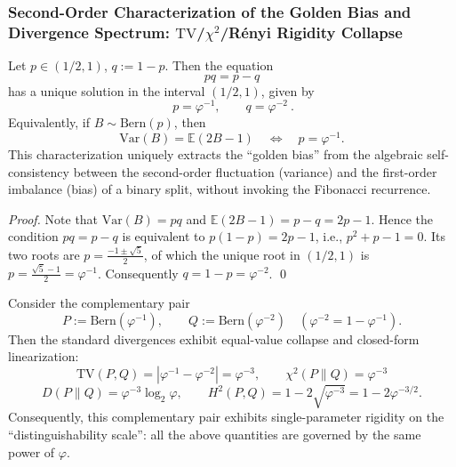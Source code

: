 \subsubsection{Second-Order Characterization of the Golden Bias and Divergence Spectrum: \texorpdfstring{$\mathrm{TV}$}{TV}/\texorpdfstring{$\chi^2$}{chi2}/R\'enyi Rigidity Collapse}

\begin{proposition}[``Variance = Bias'' Characterization and Uniqueness of the Golden Bias]\label{prop:pom-golden-bias-variance-equals-bias}
Let \(p\in(1/2,1)\), \(q:=1-p\).
Then the equation
\[
pq=p-q
\]
has a unique solution in the interval \((1/2,1)\), given by
\[
\boxed{\ p=\varphi^{-1},\qquad q=\varphi^{-2}\ }.
\]
Equivalently, if \(B\sim\mathrm{Bern}(p)\), then
\[
\mathrm{Var}(B)=\mathbb{E}(2B-1)
\quad\Longleftrightarrow\quad
p=\varphi^{-1}.
\]
This characterization uniquely extracts the ``golden bias'' from the algebraic self-consistency between the second-order fluctuation (variance) and the first-order imbalance (bias) of a binary split, without invoking the Fibonacci recurrence.
\end{proposition}

\begin{proof}
Note that \(\mathrm{Var}(B)=pq\) and \(\mathbb{E}(2B-1)=p-q=2p-1\).
Hence the condition \(pq=p-q\) is equivalent to
\(
p(1-p)=2p-1
\), i.e.,
\(
p^2+p-1=0
\).
Its two roots are \(p=\frac{-1\pm\sqrt5}{2}\), of which the unique root in \((1/2,1)\) is \(p=\frac{\sqrt5-1}{2}=\varphi^{-1}\).
Consequently \(q=1-p=\varphi^{-2}\). \qed
\end{proof}

\begin{proposition}\label{prop:pom-complementary-golden-bernoulli-divergence-collapse}
Consider the complementary pair
\[
P:=\mathrm{Bern}(\varphi^{-1}),\qquad
Q:=\mathrm{Bern}(\varphi^{-2})\quad(\varphi^{-2}=1-\varphi^{-1}).
\]
Then the standard divergences exhibit equal-value collapse and closed-form linearization:
\[
\boxed{\;
\mathrm{TV}(P,Q)=|\varphi^{-1}-\varphi^{-2}|=\varphi^{-3},\qquad
\chi^2(P\|Q)=\varphi^{-3}\;}
\]
\[
\boxed{\;
D(P\|Q)=\varphi^{-3}\log_2\varphi,\qquad
H^2(P,Q)=1-2\sqrt{\varphi^{-3}}=1-2\varphi^{-3/2}.\;}
\]
Consequently, this complementary pair exhibits single-parameter rigidity on the ``distinguishability scale'': all the above quantities are governed by the same power of \(\varphi\).
\end{proposition}

